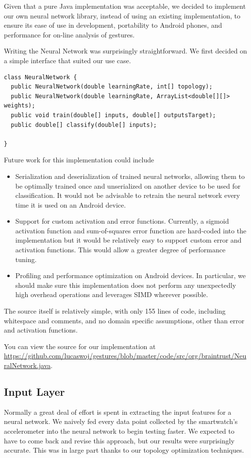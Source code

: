 \documentclass{report}
\begin{document}
Given that a pure Java implementation was acceptable, we decided to implement our own neural network library, instead of using an existing implementation, to ensure its ease of use in development, portability to Android phones, and performance for on-line analysis of gestures.

Writing the Neural Network was surprisingly straightforward. We first decided on a simple interface that suited our use case.
\begin{verbatim}
class NeuralNetwork {
  public NeuralNetwork(double learningRate, int[] topology);
  public NeuralNetwork(double learningRate, ArrayList<double[][]> weights);
  public void train(double[] inputs, double[] outputsTarget);
  public double[] classify(double[] inputs);

}
\end{verbatim}

Future work for this implementation could include
\begin{itemize}
\item Serialization and deserialization of trained neural networks, allowing them to be optimally trained once and unserialized on another device to be used for classification. It would not be advisable to retrain the neural network every time it is used on an Android device.
\item Support for custom activation and error functions. Currently, a sigmoid activation function and sum-of-squares error function are hard-coded into the implementation but it would be relatively easy to support custom error and activation functions. This would allow a greater degree of performance tuning.
\item Profiling and performance optimization on Android devices. In particular, we should make sure this implementation does not perform any unexpectedly high overhead operations and leverages SIMD wherever possible.
\end{itemize}

The source itself is relatively simple, with only 155 lines of code, including whitespace and comments, and no domain specific assumptions, other than error and activation functions.

You can view the source for our implementation at \url{https://github.com/lucaswoj/gestures/blob/master/code/src/org/braintrust/NeuralNetwork.java}.

\subsection{Input Layer}
Normally a great deal of effort is spent in extracting the input features for a neural network. We naively fed every data point collected by the smartwatch's accelerometer into the neural network to begin testing faster. We expected to have to come back and revise this approach, but our results were surprisingly accurate. This was in large part thanks to our topology optimization techniques. 
\end{document}
